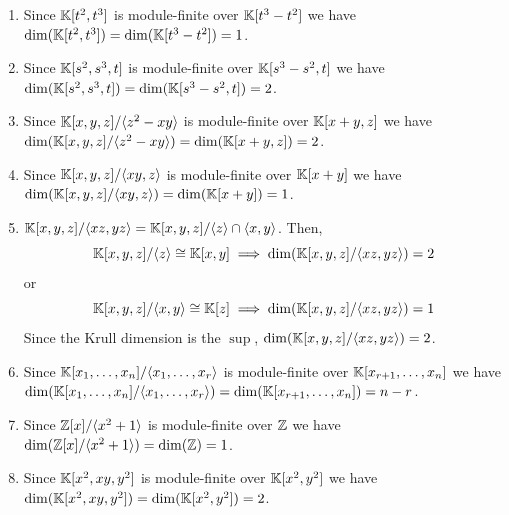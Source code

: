\documentclass[Notebook.tex]{subfiles}
\begin{document}
\begin{solution}
    \bbni
    \begin{enumerate}
        \item Since $\mathbb K[t^2, t^3]$ is module-finite over $\mathbb K[t^3 - t^2]$ we have $\dim(\mathbb K[t^2, t^3]) = \dim(\mathbb K[t^3 - t^2]) = 1$. 
        \item Since $\mathbb K[s^2, s^3, t]$ is module-finite over $\mathbb K[s^3 - s^2, t]$ we have $\dim(\mathbb K[s^2, s^3, t]) = \dim(\mathbb K[s^3 - s^2, t]) = 2$. 
        \item Since $\mathbb K[x, y, z] / \langle z^2 - xy \rangle$ is module-finite over $\mathbb K[x + y, z]$ we have $\dim(\mathbb K[x, y, z] / \langle z^2 - xy \rangle) = \dim(\mathbb K[x+y, z]) = 2$.
        \item Since $\mathbb K[x, y, z] / \langle xy, z \rangle$ is module-finite over $\mathbb K[x + y]$ we have $\dim(\mathbb K[x, y, z] / \langle xy, z \rangle) = \dim(\mathbb K[x+y ]) = 1$.
        \item $\mathbb K[x, y, z] / \langle xz, yz \rangle = \mathbb K[x, y, z] / \langle z \rangle \cap \langle x, y \rangle$. Then, 
        \[\mathbb K[x, y, z] / \langle z \rangle \cong \mathbb K[x,y] \implies \dim(\mathbb K[x, y, z] / \langle xz, yz \rangle) = 2\] 
        or 
        \[\mathbb K[x, y, z] / \langle x, y \rangle \cong \mathbb K[z] \implies \dim(\mathbb K[x, y, z] / \langle xz, yz \rangle) = 1\] 
        Since the Krull dimension is the $\sup$, $\dim(\mathbb K[x, y, z] / \langle xz, yz \rangle)= 2$. 
        \item Since $\mathbb K[x_1,\ldots,x_n]/\langle x_1,\ldots,x_r\rangle$ is module-finite over $\mathbb K[x_{r+1}, \ldots, x_n]$ we have \\
        $\dim(\mathbb K[x_1,\ldots,x_n]/\langle x_1,\ldots,x_r\rangle) = \dim(\mathbb K[x_{r+1}, \ldots, x_n]) = n - r$. 
        \item Since $\mathbb Z[x] / \langle x^2 +1 \rangle$ is module-finite over $\mathbb Z$ we have $\dim(\mathbb Z[x] / \langle x^2 +1 \rangle) = \dim(\mathbb Z) = 1$.
        \item Since $\mathbb K[x^2, xy, y^2]$ is module-finite over $\mathbb K[x^2, y^2]$ we have $\dim(\mathbb K[x^2, xy,  y^2]) = \dim(\mathbb K[x^2, y^2]) = 2$. 
    \end{enumerate}
\end{solution}

\newpage 
\end{document}
